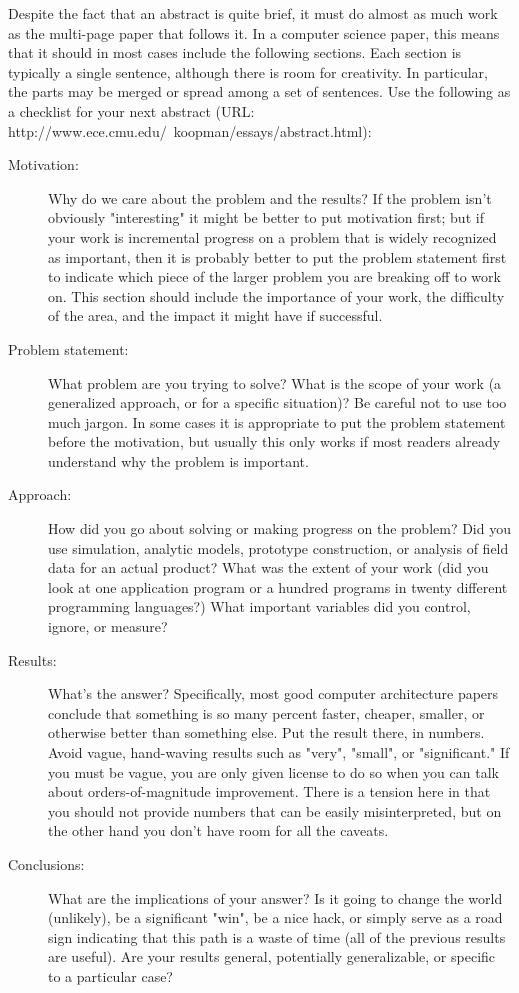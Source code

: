 

Despite the fact that an abstract is quite brief, it must do almost as much work as the multi-page paper that follows it. In a computer science paper, this means that it should in most cases include the following sections. Each section is typically a single sentence, although there is room for creativity. In particular, the parts may be merged or spread among a set of sentences. Use the following as a checklist for your next abstract (URL: http://www.ece.cmu.edu/~koopman/essays/abstract.html):

\begin{description}
  \item[Motivation:] Why do we care about the problem and the results? If the problem isn't obviously
"interesting" it might be better to put motivation first; but if your work is incremental progress
on a problem that is widely recognized as important, then it is probably better to put the problem
statement first to indicate which piece of the larger problem you are breaking off to work on. This
section should include the importance of your work, the difficulty of the area, and the impact it
might have if successful.
  \item[Problem statement:]  What problem are you trying to solve? What is the
scope of your work (a generalized approach, or for a specific situation)? Be careful not to use too
much jargon. In some cases it is appropriate to put the problem statement before the motivation,
but usually this only works if most readers already understand why the problem is important.
  \item[Approach:] How did you go about solving or making progress on the problem? Did you use simulation,
analytic models, prototype construction, or analysis of field data for an actual product? What was
the extent of your work (did you look at one application program or a hundred programs in twenty
different programming languages?) What important variables did you control, ignore, or measure?
  \item[Results:] What's the answer? Specifically, most good computer architecture papers conclude that
something is so many percent faster, cheaper, smaller, or otherwise better than something else. Put
the result there, in numbers. Avoid vague, hand-waving results such as "very", "small", or
"significant." If you must be vague, you are only given license to do so when you can talk about
orders-of-magnitude improvement. There is a tension here in that you should not provide numbers
that can be easily misinterpreted, but on the other hand you don't have room for all the caveats.
  \item[Conclusions:] What are the implications of your answer? Is it going to change the world (unlikely),
be a significant "win", be a nice hack, or simply serve as a road sign indicating that this path is
a waste of time (all of the previous results are useful). Are your results general, potentially
generalizable, or specific to a particular case?

\end{description}




\smallskip


